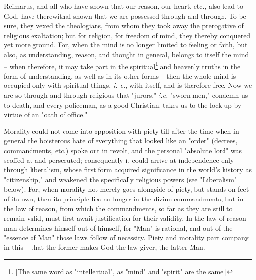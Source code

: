 \documentclass[a4paper]{book}
\begin{document}
Reimarus, and all who have shown that our reason, our heart, etc., also lead 
to God, have therewithal shown that we are possessed through and through. To 
be sure, they vexed the theologians, from whom they took away the prerogative 
of religious exaltation; but for religion, for freedom of mind, they thereby 
conquered yet more ground. For, when the mind is no longer limited to feeling 
or faith, but also, as understanding, reason, and thought in general, belongs 
to itself the mind -- when therefore, it may take part in the 
spiritual\footnote{[The same word as "{}intellectual"{}, as "{}mind"{} and 
"{}spirit"{} are the same.]} and heavenly truths in the form of understanding, 
as well as in its other forms -- then the whole mind is occupied only with 
spiritual things, \textit{i. e.}, with itself, and is therefore free. Now we 
are so through-and-through religious that "{}jurors,"{} \textit{i.e.} "{}sworn 
men,"{} condemn us to death, and every policeman, as a good Christian, takes 
us to the lock-up by virtue of an "{}oath of office."{}

Morality could not come into opposition with piety till after the time when in 
general the boisterous hate of everything that looked like an "{}order"{} 
(decrees, commandments, etc.) spoke out in revolt, and the personal 
"{}absolute lord"{} was scoffed at and persecuted; consequently it could 
arrive at independence only through liberalism, whose first form acquired 
significance in the world's history as "{}citizenship,"{} and weakened the 
specifically religious powers (see "{}Liberalism"{} below). For, when morality 
not merely goes alongside of piety, but stands on feet of its own, then its 
principle lies no longer in the divine commandments, but in the law of reason, 
from which the commandments, so far as they are still to remain valid, must 
first await justification for their validity. In the law of reason man 
determines himself out of himself, for "{}Man"{} is rational, and out of the 
"{}essence of Man"{} those laws follow of necessity. Piety and morality part 
company in this -- that the former makes God the law-giver, the latter Man.
\end{document}
